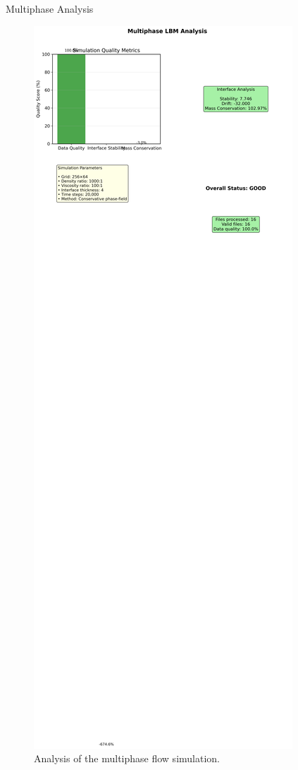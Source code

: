 \documentclass{beamer}
\begin{document}
\begin{frame}{Multiphase Analysis}
  \begin{figure}
    \includegraphics[width=\textwidth]{plots/multiphase_analysis.png}
    \caption{Analysis of the multiphase flow simulation.}
  \end{figure}
\end{frame}
\end{document}

